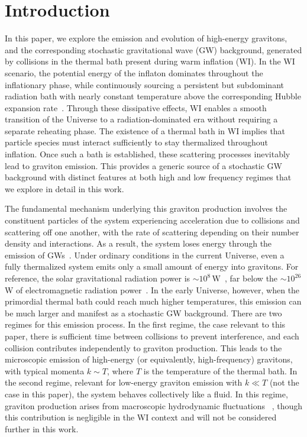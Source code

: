 \section{Introduction}

In this paper, we explore the emission and evolution of high-energy gravitons, and the corresponding stochastic gravitational wave (GW) background, generated by collisions in the thermal bath present during warm inflation (WI).
In the WI scenario, the potential energy of the inflaton dominates throughout the inflationary
phase, while continuously sourcing a persistent but subdominant radiation bath with nearly constant temperature above the corresponding Hubble expansion rate~\cite{Berera:1995ie,Berera:1995wh,Berera:1998px}. Through these dissipative effects, WI enables a smooth transition of the Universe to a radiation-dominated era without requiring a separate reheating phase. The existence of a thermal bath in WI implies that particle species must interact sufficiently to stay thermalized throughout inflation. Once such a bath is established,  these scattering processes inevitably lead to graviton emission. This provides a generic source of a stochastic GW background with distinct features at both high and low frequency regimes that we explore in detail in this work.

\medskip
The fundamental mechanism underlying this graviton production involves the constituent particles of the system experiencing acceleration due to collisions and scattering off one another, with the rate of scattering depending on their number density and interactions. As a result, the system loses energy through the emission of GWs~\cite{Weinberg:1972kfs}. Under ordinary conditions in the current Universe, even a fully thermalized system emits only a small amount of energy into gravitons. For reference, the solar gravitational radiation power is $\sim 10^8\,\mathrm{W}$~\cite{Weinberg:1965nx,2024arXiv240718297G},
far below the $\sim 10^{26}$ W of electromagnetic radiation power~\cite{IAUInter-DivisionA-GWorkingGrouponNominalUnitsforStellarPlanetaryAstronomy:2015fjh}. In the early Universe, however, when the primordial thermal bath could reach much higher temperatures, this emission can be much larger and manifest as a stochastic GW background. There are two regimes for this emission process. In the first regime, the case relevant to this paper, there is sufficient time between collisions to prevent interference, and each collision contributes independently to graviton production. This leads to the microscopic emission of high-energy (or equivalently, high-frequency) gravitons, with typical momenta $k \sim T$, where $T$ is the temperature of the thermal bath. In the second regime, relevant for low-energy graviton emission with $k \ll T$ (not the case in this paper), the system behaves collectively like a fluid. In this regime, graviton production arises from macroscopic hydrodynamic fluctuations ~\cite{Weinberg:1972kfs, Ghiglieri:2015nfa, Ghiglieri:2020mhm},  though this contribution is negligible in the WI context and will not be considered further in this work.


